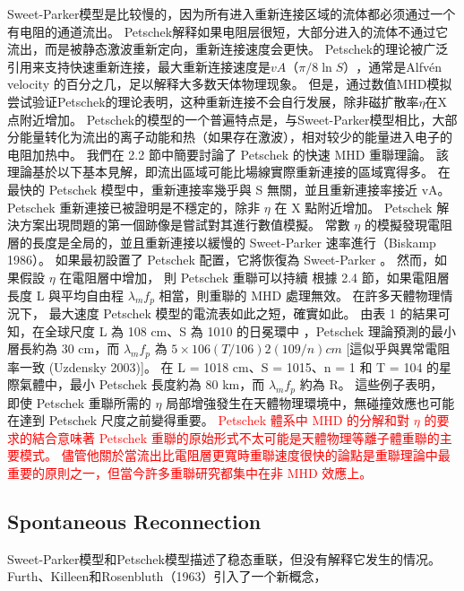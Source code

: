 \documentclass[12pt, a4paper, oneside]{article}
\begin{document}
\begin{spacing}{2.0}
Sweet-Parker模型是比较慢的，因为所有进入重新连接区域的流体都必须通过一个有电阻的通道流出。
Petschek解释如果电阻层很短，大部分进入的流体不通过它流出，而是被静态激波重新定向，重新连接速度会更快。
Petschek的理论被广泛引用来支持快速重新连接，最大重新连接速度是$vA（π/8 \ln S）$，通常是Alfvén velocity 的百分之几，足以解释大多数天体物理现象。
但是，通过数值MHD模拟尝试验证Petschek的理论表明，这种重新连接不会自行发展，除非磁扩散率$\eta$在X点附近增加。
Petschek的模型的一个普遍特点是，与Sweet-Parker模型相比，大部分能量转化为流出的离子动能和热（如果存在激波），相对较少的能量进入电子的电阻加热中。
我們在 2.2 節中簡要討論了 Petschek 的快速 MHD 重聯理論。 該理論基於以下基本見解，即流出區域可能比場線實際重新連接的區域寬得多。 
在最快的 Petschek 模型中，重新連接率幾乎與 S 無關，並且重新連接率接近 vA。 Petschek 重新連接已被證明是不穩定的，除非 $\eta$ 在 X 點附近增加。 
Petschek 解決方案出現問題的第一個跡像是嘗試對其進行數值模擬。 常數 $\eta$ 的模擬發現電阻層的長度是全局的，並且重新連接以緩慢的 Sweet-Parker 
速率進行（Biskamp 1986）。 如果最初設置了 Petschek 配置，它將恢復為 Sweet-Parker 。 然而，如果假設 $\eta$ 在電阻層中增加，
則 Petschek 重聯可以持續 
根據 2.4 節，如果電阻層長度 L 與平均自由程 $\lambda_m f_p$ 相當，則重聯的 MHD 處理無效。 在許多天體物理情況下，
最大速度 Petschek 模型的電流表如此之短，確實如此。 由表 1 的結果可知，在全球尺度 L 為 108 cm、S 為 1010 的日冕環中
，Petschek 理論預測的最小層長約為 30 cm，而 $\lambda_m f_p$ 為 $5 \times 106 (T/106) 2(109/n) cm$ [這似乎與異常電阻率一致 (Uzdensky 2003)]。 
在 L = 1018 cm、S = 1015、n = 1 和 T = 104 的星際氣體中，最小 Petschek 長度約為 80 km，而 $\lambda_m f_p$ 約為 R。 這些例子表明，
即使 Petschek 重聯所需的 $\eta$ 局部增強發生在天體物理環境中，無碰撞效應也可能在達到 Petschek 尺度之前變得重要。
\textcolor{red}{Petschek 體系中 MHD 的分解和對 $\eta$ 的要求的結合意味著 Petschek 重聯的原始形式不太可能是天體物理等離子體重聯的主要模式。 
儘管他關於當流出比電阻層更寬時重聯速度很快的論點是重聯理論中最重要的原則之一，但當今許多重聯研究都集中在非 MHD 效應上。}

\subsection{Spontaneous Reconnection}
Sweet-Parker模型和Petschek模型描述了稳态重联，但没有解释它发生的情况。Furth、Killeen和Rosenbluth（1963）引入了一个新概念，


\end{spacing}
\end{document}
